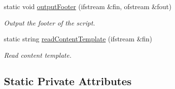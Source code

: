 \begin{DoxyCompactItemize}
static void \hyperlink{classmultiscale_1_1video_1_1PolarGnuplotScriptGenerator_ad572033c31036eb4b3fd041eaf70ec5f}{output\-Footer} (ifstream \&fin, ofstream \&fout)
\begin{DoxyCompactList}\small\item\em \-Output the footer of the script. \end{DoxyCompactList}\item 
static string \hyperlink{classmultiscale_1_1video_1_1PolarGnuplotScriptGenerator_a539bef80a3f6313a0df4c72107075e35}{read\-Content\-Template} (ifstream \&fin)
\begin{DoxyCompactList}\small\item\em \-Read content template. \end{DoxyCompactList}\end{DoxyCompactItemize}
\subsection*{\-Static \-Private \-Attributes}
